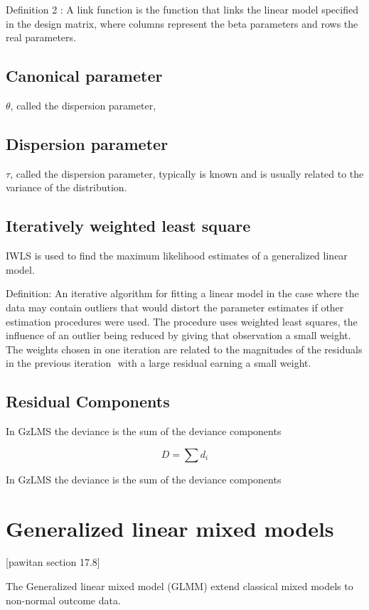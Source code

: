\documentclass[12pt, a4paper]{report}
\theoremstyle{plain}
\theoremstyle{definition}
\theoremstyle{remark}
\begin{document}
	\noindent Definition 2 : A link function is the function that
	links the linear model specified in the design matrix, where
	columns represent the beta parameters and rows the real
	parameters.
	
	\subsection{Canonical parameter}
	$\theta$, called the dispersion parameter,
	\subsection{Dispersion parameter}
	$\tau$, called the dispersion parameter, typically is known and is
	usually related to the variance of the distribution.
	
	\subsection{Iteratively weighted least square}
	IWLS is used to find the maximum likelihood estimates of a
	generalized linear model.
	
	\noindent Definition: An iterative algorithm for fitting a linear
	model in the case where the data may contain outliers that would
	distort the parameter estimates if other estimation procedures
	were used. The procedure uses weighted least squares, the
	influence of an outlier being reduced by giving that observation a
	small weight. The weights chosen in one iteration are related to
	the magnitudes of the residuals in the previous iteration  with a
	large residual earning a small weight.
	
	\subsection{Residual Components}
	In GzLMS the deviance is the sum of the deviance components
	
	\begin{equation}
	D = \sum d_{i}
	\end{equation}
	
	In GzLMS the deviance is the sum of the deviance components
	
	
	\section{Generalized linear mixed models}
	[pawitan section 17.8]
	
	The Generalized linear mixed model (GLMM) extend classical mixed models to non-normal outcome data.
	
\end{document}
